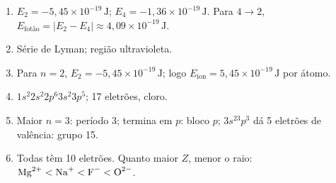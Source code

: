 \documentclass[11pt,a4paper,oneside]{book}
\begin{document}
\begin{enumerate}
  \item $E_2=-5{,}45\times10^{-19}\,\mathrm J$; $E_4=-1{,}36\times10^{-19}\,\mathrm J$. Para $4\to2$, $E_{\text{fotão}}=|E_2-E_4|\approx4{,}09\times10^{-19}\,\mathrm J$.
  \item Série de Lyman; região ultravioleta.
  \item Para $n=2$, $E_2=-5{,}45\times10^{-19}\,\mathrm J$; logo $E_{\text{ion}}=5{,}45\times10^{-19}\,\mathrm J$ por átomo.
  \item $1s^2 2s^2 2p^6 3s^2 3p^5$; 17 eletrões, cloro.
  \item Maior $n=3$: período 3; termina em $p$: bloco $p$; $3s^23p^3$ dá 5 eletrões de valência: grupo 15.
  \item Todas têm 10 eletrões. Quanto maior $Z$, menor o raio: $\ce{Mg^{2+}}<\ce{Na+}<\ce{F^-}<\ce{O^{2-}}$.
\end{enumerate}
\end{document}
